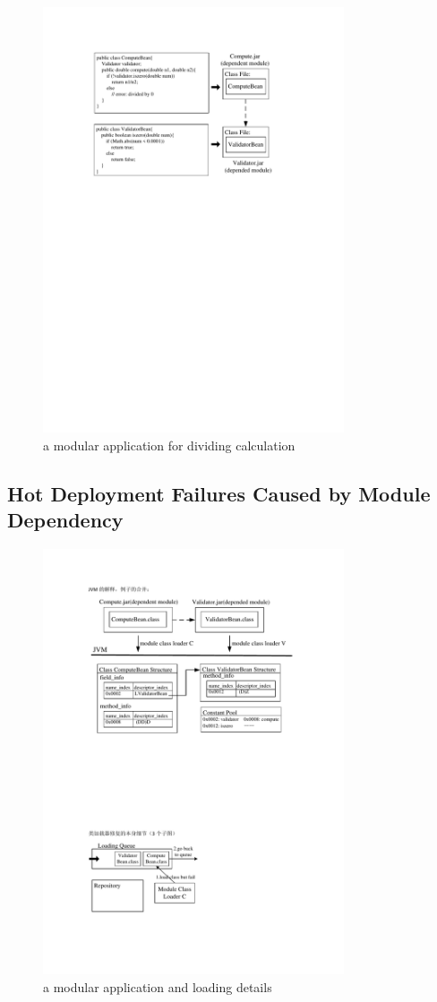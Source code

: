 \documentclass[conference]{IEEEtran}
\begin{document}
\begin{figure}[ht]
\centering
\includegraphics[width=3.5in]{ExampleEJB.pdf}
\caption{a modular application for dividing calculation}
\label{fig:example}
\end{figure}


\subsection{Hot Deployment Failures Caused by Module Dependency}

\begin{figure}[ht]
\centering
\includegraphics[width=3.5in]{ExampleJVM.pdf}
\caption{a modular application and loading details}
\label{fig:example_jvm}
\end{figure}
\end{document}
